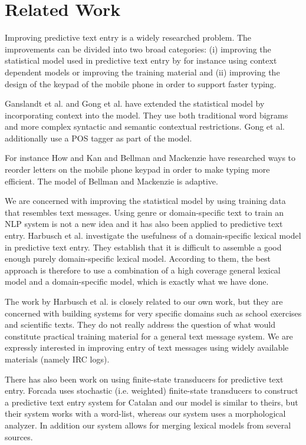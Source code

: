 \documentclass[a4paper,conference]{IEEEtran}
\begin{document}
\section{Related Work}
\label{sec:related-work}

Improving predictive text entry is a widely researched problem. The
improvements can be divided into two broad categories: (i) improving
the statistical model used in predictive text entry by for instance using
context dependent models or improving the training material and (ii)
improving the design of the keypad of the mobile phone in order to
support faster typing.

Ganslandt et al. \cite{ganslandt/2009} and Gong et
al. \cite{gong/2008} have extended the statistical model by
incorporating context into the model. They use both traditional word
bigrams and more complex syntactic and semantic contextual
restrictions. Gong et al. additionally use a POS tagger as part of the
model.

For instance How and Kan \cite{how05optimizing} and Bellman and Mackenzie
\cite{Department98aprobabilistic} have researched ways to reorder
letters on the mobile phone keypad in order to make typing more
efficient. The model of Bellman and Mackenzie is adaptive.

We are concerned with improving the statistical model by using
training data that resembles text messages. Using genre or
domain-specific text to train an NLP system is not a new idea and it
has also been applied to predictive text entry. Harbusch et
al. \cite{Harbusch/2003} investigate the usefulness of a
domain-specific lexical model in predictive text entry. They establish
that it is difficult to assemble a good enough purely domain-specific
lexical model. According to them, the best approach is therefore to use a
combination of a high coverage general lexical model and a domain-specific
model, which is exactly what we have done.

The work by Harbusch et al. is closely related to our own work, but they
are concerned with building systems for very specific domains such as
school exercises and scientific texts. They do not really address the
question of what would constitute practical training material for a
general text message system. We are expressly interested in improving
entry of text messages using widely available materials (namely IRC logs).

There has also been work on using finite-state transducers for
predictive text entry. Forcada \cite{Forcada01corpus-basedstochastic} uses
stochastic (i.e. weighted) finite-state transducers to construct a
predictive text entry system for Catalan and our model is similar to
theirs, but their system works with a word-list, whereas our system
uses a morphological analyzer.  In addition our system allows for
merging lexical models from several sources.
 
\end{document}

